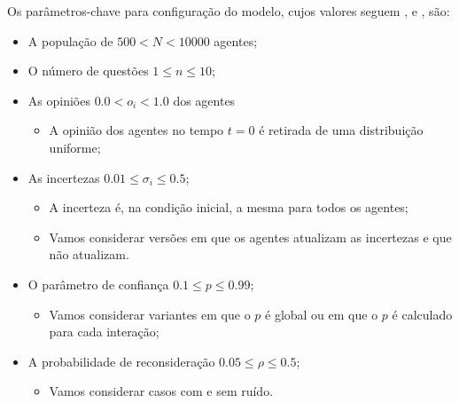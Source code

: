 Os parâmetros-chave para configuração do modelo, cujos valores seguem
,  e ,  são:
\begin{itemize}
\item A população de \(500 < N < 10000\) agentes;
\item O número de questões \(1 \leq n \leq 10\); 
\item As opiniões \(0.0< o_i< 1.0\) dos agentes
  \begin{itemize}
  \item A opinião dos agentes no tempo \(t = 0\) é retirada de uma distribuição
    uniforme;
  \end{itemize}
\item As incertezas \(0.01 \leq \sigma_i \leq 0.5\);
  \begin{itemize}
  \item A incerteza é, na condição inicial, a mesma para todos os agentes;
  \item Vamos considerar versões em que os agentes atualizam as incertezas e que
    não atualizam.
  \end{itemize}

\item O parâmetro de confiança \(0.1 \leq p \leq 0.99\);
  \begin{itemize}
  \item Vamos considerar variantes em que o \(p\) é global ou em que o \(p\) é
    calculado para cada interação;
  \end{itemize}
  
\item A probabilidade de reconsideração \(0.05 \leq \rho  \leq 0.5\);
  \begin{itemize}
  \item Vamos considerar casos com e sem ruído.
  \end{itemize}
\end{itemize}
























